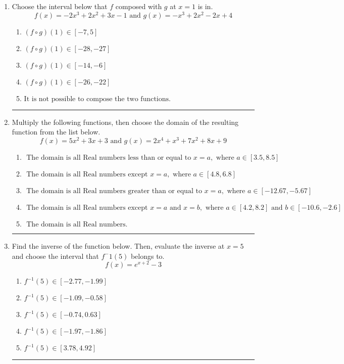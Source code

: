 \documentclass[14pt]{extbook}
\newcommand{\litem}[1]{\item#1\hspace*{-1cm}\rule{\textwidth}{0.4pt}}
\begin{document}
\begin{enumerate}
{\begin{enumerate}[label=\Alph*.]
\end{enumerate} }
\litem{
Choose the interval below that $f$ composed with $g$ at $x=1$ is in.\[ f(x) = -2x^{3} +2 x^{2} +3 x -1 \text{ and } g(x) = -x^{3} +2 x^{2} -2 x + 4 \]\begin{enumerate}[label=\Alph*.]
\item \( (f \circ g)(1) \in [-7, 5] \)
\item \( (f \circ g)(1) \in [-28, -27] \)
\item \( (f \circ g)(1) \in [-14, -6] \)
\item \( (f \circ g)(1) \in [-26, -22] \)
\item \( \text{It is not possible to compose the two functions.} \)

\end{enumerate} }
\litem{
Multiply the following functions, then choose the domain of the resulting function from the list below.\[ f(x) = 5x^{2} +3 x + 3 \text{ and } g(x) = 2x^{4} + x^{3} +7 x^{2} +8 x + 9 \]\begin{enumerate}[label=\Alph*.]
\item \( \text{ The domain is all Real numbers less than or equal to } x = a, \text{ where } a \in [3.5, 8.5] \)
\item \( \text{ The domain is all Real numbers except } x = a, \text{ where } a \in [4.8, 6.8] \)
\item \( \text{ The domain is all Real numbers greater than or equal to } x = a, \text{ where } a \in [-12.67, -5.67] \)
\item \( \text{ The domain is all Real numbers except } x = a \text{ and } x = b, \text{ where } a \in [4.2, 8.2] \text{ and } b \in [-10.6, -2.6] \)
\item \( \text{ The domain is all Real numbers. } \)

\end{enumerate} }
\litem{
Find the inverse of the function below. Then, evaluate the inverse at $x = 5$ and choose the interval that $f^-1(5)$ belongs to.\[ f(x) = e^{x+2}-3 \]\begin{enumerate}[label=\Alph*.]
\item \( f^{-1}(5) \in [-2.77, -1.99] \)
\item \( f^{-1}(5) \in [-1.09, -0.58] \)
\item \( f^{-1}(5) \in [-0.74, 0.63] \)
\item \( f^{-1}(5) \in [-1.97, -1.86] \)
\item \( f^{-1}(5) \in [3.78, 4.92] \)


\end{enumerate}}
\end{enumerate}
\end{document}
